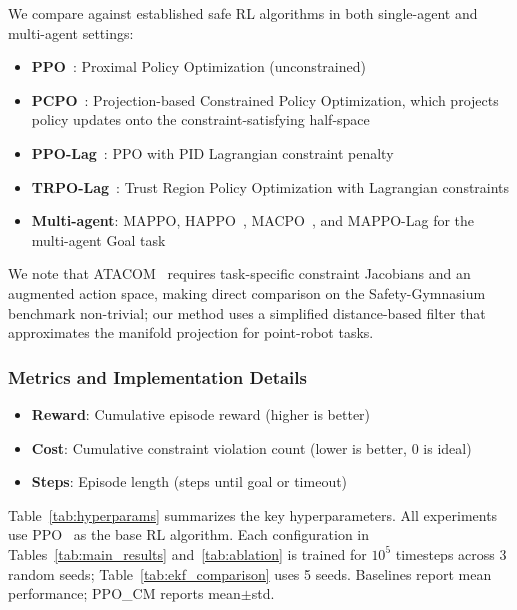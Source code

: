 \documentclass[letterpaper, 10 pt, conference]{ieeeconf}
\begin{document}
We compare against established safe RL algorithms in both single-agent and multi-agent settings:
\begin{itemize}
    \item \textbf{PPO}~\cite{schulman2017ppo}: Proximal Policy Optimization (unconstrained)
    \item \textbf{PCPO}~\cite{yang2020pcpo}: Projection-based Constrained Policy Optimization, which projects policy updates onto the constraint-satisfying half-space
    \item \textbf{PPO-Lag}~\cite{stooke2020responsive}: PPO with PID Lagrangian constraint penalty
    \item \textbf{TRPO-Lag}~\cite{achiam2017cpo}: Trust Region Policy Optimization with Lagrangian constraints
    \item \textbf{Multi-agent}: MAPPO, HAPPO~\cite{kuba2022happo}, MACPO~\cite{gu2023macpo}, and MAPPO-Lag for the multi-agent Goal task
\end{itemize}
We note that ATACOM~\cite{liu2022atacom} requires task-specific constraint Jacobians and an augmented action space, making direct comparison on the Safety-Gymnasium benchmark non-trivial; our method uses a simplified distance-based filter that approximates the manifold projection for point-robot tasks.

\subsubsection{Metrics and Implementation Details}

\begin{itemize}
    \item \textbf{Reward}: Cumulative episode reward (higher is better)
    \item \textbf{Cost}: Cumulative constraint violation count (lower is better, 0 is ideal)
    \item \textbf{Steps}: Episode length (steps until goal or timeout)
\end{itemize}

Table~\ref{tab:hyperparams} summarizes the key hyperparameters. All experiments use PPO~\cite{schulman2017ppo} as the base RL algorithm. Each configuration in Tables~\ref{tab:main_results} and~\ref{tab:ablation} is trained for $10^5$ timesteps across 3 random seeds; Table~\ref{tab:ekf_comparison} uses 5 seeds. Baselines report mean performance; PPO\_CM reports mean$\pm$std.
\end{document}
